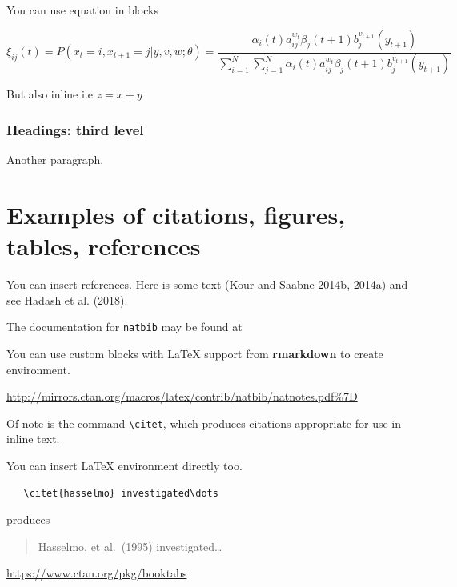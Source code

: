 \documentclass{article}
\begin{document}
You can use equation in blocks

\[
\xi _{ij}(t)=P(x_{t}=i,x_{t+1}=j|y,v,w;\theta)= {\frac {\alpha _{i}(t)a^{w_t}_{ij}\beta _{j}(t+1)b^{v_{t+1}}_{j}(y_{t+1})}{\sum _{i=1}^{N} \sum _{j=1}^{N} \alpha _{i}(t)a^{w_t}_{ij}\beta _{j}(t+1)b^{v_{t+1}}_{j}(y_{t+1})}}
\]

But also inline i.e \(z=x+y\)

\hypertarget{headings-third-level}{%
\subsubsection{Headings: third level}\label{headings-third-level}}

Another paragraph.

\hypertarget{examples-of-citations-figures-tables-references}{%
\section{Examples of citations, figures, tables,
references}\label{examples-of-citations-figures-tables-references}}

\label{sec:others}

You can insert references. Here is some text (Kour and Saabne 2014b,
2014a) and see Hadash et al. (2018).

The documentation for \verb+natbib+ may be found at

You can use custom blocks with LaTeX support from \textbf{rmarkdown} to
create environment.

\begin{center}
\url{http://mirrors.ctan.org/macros/latex/contrib/natbib/natnotes.pdf\%7D}

\end{center}

Of note is the command \verb+\citet+, which produces citations
appropriate for use in inline text.

You can insert LaTeX environment directly too.

\begin{verbatim}
   \citet{hasselmo} investigated\dots
\end{verbatim}

produces

\begin{quote}
  Hasselmo, et al.\ (1995) investigated\dots
\end{quote}

\begin{center}
  \url{https://www.ctan.org/pkg/booktabs}
\end{center}
\end{document}
